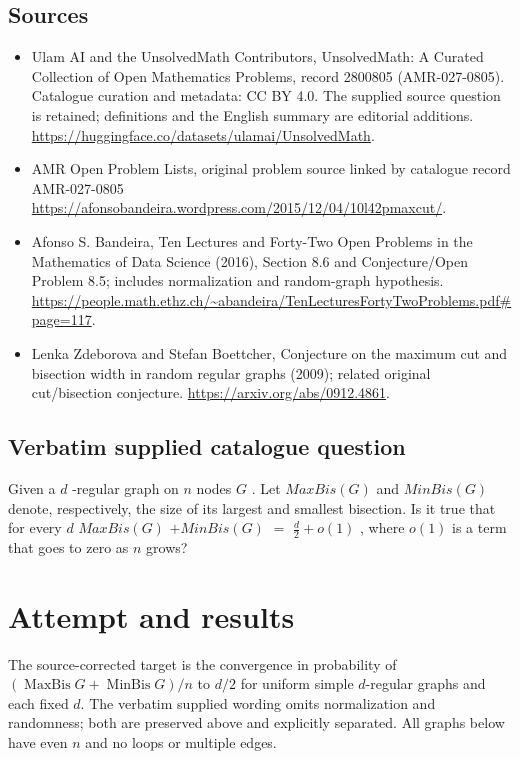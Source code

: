 \documentclass[11pt]{article}
\begin{document}
\subsection{Sources}
\begin{itemize}
\item[S1] Ulam AI and the UnsolvedMath Contributors, UnsolvedMath: A Curated Collection of Open Mathematics Problems, record 2800805 (AMR-027-0805). Catalogue curation and metadata: CC BY 4.0. The supplied source question is retained; definitions and the English summary are editorial additions.
\url{https://huggingface.co/datasets/ulamai/UnsolvedMath}.
\item[S2] AMR Open Problem Lists, original problem source linked by catalogue record AMR-027-0805
\url{https://afonsobandeira.wordpress.com/2015/12/04/10l42pmaxcut/}.
\item[S3] Afonso S. Bandeira, Ten Lectures and Forty-Two Open Problems in the Mathematics of Data Science (2016), Section 8.6 and Conjecture/Open Problem 8.5; includes normalization and random-graph hypothesis.
\url{https://people.math.ethz.ch/~abandeira/TenLecturesFortyTwoProblems.pdf#page=117}.
\item[S4] Lenka Zdeborova and Stefan Boettcher, Conjecture on the maximum cut and bisection width in random regular graphs (2009); related original cut/bisection conjecture.
\url{https://arxiv.org/abs/0912.4861}.
\end{itemize}
\subsection{Verbatim supplied catalogue question}
Given a $d$ -regular graph on $n$ nodes $G$ . Let $MaxBis(G)$ and $MinBis(G)$ denote, respectively, the size of its largest and smallest bisection. Is it true that for every $d$ $MaxBis(G)$ $+ MinBis(G)$ $=$ $\frac{d}{2} + o(1)$ , where $o(1)$ is a term that goes to zero as $n$ grows?

\section{Attempt and results}
The source-corrected target is the convergence in probability of
$(\operatorname{MaxBis}G+\operatorname{MinBis}G)/n$ to $d/2$ for uniform
simple $d$-regular graphs and each fixed $d$. The verbatim supplied wording
omits normalization and randomness; both are preserved above and explicitly
separated. All graphs below have even $n$ and no loops or multiple edges.
\end{document}
